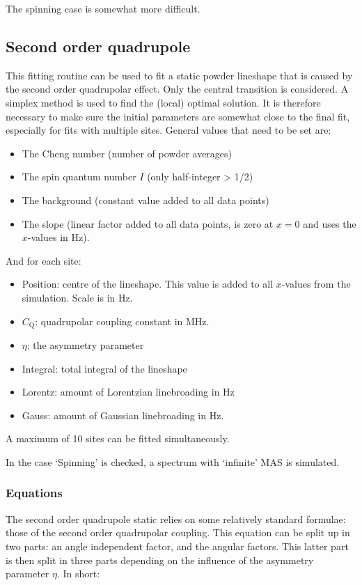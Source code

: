 \documentclass[11pt,a4paper]{article}
\begin{document}
The spinning case is somewhat more difficult.

\subsection{Second order quadrupole}
This fitting routine can be used to fit a static powder lineshape that is caused by the second order
quadrupolar effect. Only the central transition is considered. A simplex method is used to find the (local)
optimal solution. It is therefore necessary to make sure the initial parameters are somewhat close to the
final fit, especially for fits with multiple sites. General values that need to be set are:
\begin{itemize}
\item The Cheng number (number of powder averages)
\item The spin quantum number $I$ (only half-integer > 1/2)
\item The background (constant value added to all data points)
\item The slope (linear factor added to all data points, is zero at $x=0$ and uses the $x$-values in Hz).
\end{itemize}
And for each site:
\begin{itemize}
\item Position: centre of the lineshape. This value is added to all $x$-values from the simulation. Scale is in Hz.
\item $C_\text{Q}$: quadrupolar coupling constant in MHz.
\item $\eta$: the asymmetry parameter
\item Integral: total integral of the lineshape
\item Lorentz: amount of Lorentzian linebroading in Hz
\item Gauss: amount of Gaussian linebroading in Hz.
\end{itemize}
A maximum of 10 sites can be fitted simultaneously.

In the case `Spinning' is checked, a spectrum with `infinite' MAS is simulated.

\subsubsection*{Equations}
The second order quadrupole static relies on some relatively standard formulae: those of the second order
quadrupolar coupling. This equation can be split up in two parts: an angle independent factor, and the angular
factors. This latter part is then split in three parts depending on the influence of the asymmetry parameter
$\eta$. In short:
\end{document}
